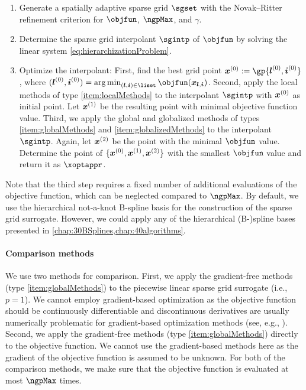 \begin{enumerate}
  \item
  Generate a spatially adaptive sparse grid $\sgset$
  with the Novak--Ritter refinement criterion
  for $\objfun$, $\ngpMax$, and $\gamma$.
  
  \item
  Determine the sparse grid interpolant $\sgintp$ of $\objfun$
  by solving the linear system \eqref{eq:hierarchizationProblem}.
  
  \item
  Optimize the interpolant:
  First, find the best grid point $\*x^{(0)} := \gp{\*l^{(0)},\*i^{(0)}}$,
  where $(\*l^{(0)},\*i^{(0)})
  = \argmin_{(\*l,\*i) \in \liset} \objfun(\*x_{\*l,\*i})$.
  Second, apply the local methods of type \ref{item:localMethods}
  to the interpolant $\sgintp$ with ${\boldsymbol{x}}^{(0)}$ as initial point.
  Let ${\boldsymbol{x}}^{(1)}$ be the resulting point with minimal objective function value.
  Third, we apply the global and globalized methods
  of types \ref{item:globalMethods} and \ref{item:globalizedMethods}
  to the interpolant $\sgintp$.
  Again, let ${\boldsymbol{x}}^{(2)}$ be the point with the
  minimal $\objfun$ value.
  Determine the point of $\{{\boldsymbol{x}}^{(0)}, {\boldsymbol{x}}^{(1)}, {\boldsymbol{x}}^{(2)}\}$
  with the smallest $\objfun$ value and return it as $\xoptappr$.
\end{enumerate}

Note that the third step requires a fixed number of additional
evaluations of the objective function,
which can be neglected compared to $\ngpMax$.
By default, we use the hierarchical not-a-knot B-spline basis for
the construction of the sparse grid surrogate.
However, we could apply any of the hierarchical (B-)spline bases presented in
\cref{chap:30BSplines,chap:40algorithms}.

\paragraph{Comparison methods}

We use two methods for comparison.
First, we apply the gradient-free methods
(type \ref{item:globalMethods}) to the piecewise linear sparse grid surrogate
(i.e., $p = 1$).
We cannot employ gradient-based optimization as the objective function
should be continuously differentiable and
discontinuous derivatives are usually numerically problematic
for gradient-based optimization methods
(see, e.g., \cite{Huebner14Mehrdimensionale}).
Second, we apply the gradient-free methods
(type \ref{item:globalMethods}) directly to the objective function.
We cannot use the gradient-based methods here as the gradient of the
objective function is assumed to be unknown.
For both of the comparison methods,
we make sure that the objective function is evaluated at most $\ngpMax$ times.

